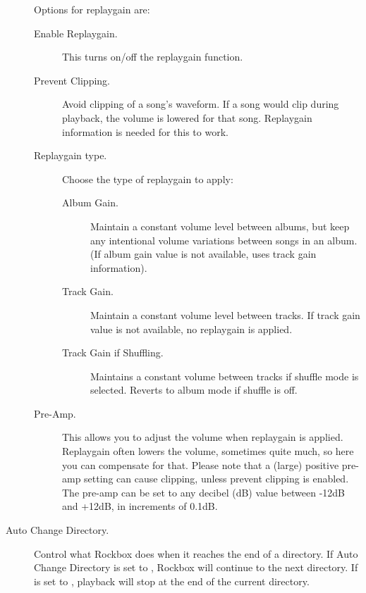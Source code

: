 \begin{description}
{{      Options for replaygain are:
      \begin{description}
      \item[Enable Replaygain. ]This turns on/off the replaygain function.
      \item[Prevent Clipping. ]Avoid clipping of a song's waveform.
        If a song would clip during playback, the volume is lowered for 
        that song. Replaygain information is needed for this to work.
      \item[Replaygain type. ]Choose the type of replaygain to apply:
        \begin{description}
        \item[Album Gain. ]Maintain a constant volume level between
          albums, but keep any intentional volume variations between 
          songs in an album. (If album gain value is not available,
          uses track gain information).
        \item[Track Gain. ]Maintain a constant volume level between
          tracks. If track gain value is not available, no replaygain 
          is applied.
        \item[Track Gain if Shuffling. ]Maintains a constant volume
          between tracks if shuffle mode is selected. Reverts to album
          mode if shuffle is off.
        \end{description}
      \item[Pre-Amp. ]This allows you to adjust the volume when replaygain
        is applied. Replaygain often lowers the volume, sometimes quite
        much, so here you can compensate for that. Please note that a 
        (large) positive pre-amp setting can cause clipping, unless 
        prevent clipping is enabled.  The pre-amp can be set to any 
        decibel (dB) value between -12dB and +12dB, in increments of 0.1{}dB.
      \end{description}
    }
  }
\item[Auto Change Directory. ]Control what Rockbox does when it reaches the end
  of a directory. If Auto Change Directory is set to , Rockbox 
  will continue to the next directory. If  is 
  set to , playback will stop at the end of the current directory.
\end{description}

